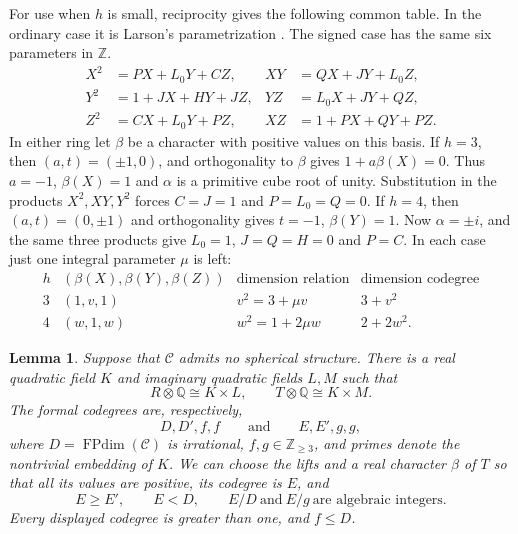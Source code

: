 \documentclass[11pt,a4paper]{article}
\newtheorem{lemma}[theorem]{Lemma}
\theoremstyle{definition}\newtheorem{definition}[theorem]{Definition}
\theoremstyle{remark}\newtheorem{remark}[theorem]{Remark}
\newcommand{\C}{\mathcal C}
\newcommand{\Q}{\mathbb Q}
\newcommand{\ZZ}{\mathbb Z}
\numberwithin{equation}{section}
\begin{document}
For use when $h$ is small, reciprocity gives the following common
table. In the ordinary case it is Larson's parametrization
\cite[Proposition~2.1]{Larson}. The signed case has the same six
parameters in $\ZZ$.
\begin{equation}\label{ns:eq:ns-signed-table}
\begin{aligned}
 X^2&=P X+L_0Y+C Z,& XY&=Q X+JY+L_0 Z,\\
 Y^2&=1+J X+H Y+J Z,& YZ&=L_0 X+J Y+Q Z,\\
 Z^2&=C X+L_0 Y+P Z,& XZ&=1+P X+Q Y+P Z .
\end{aligned}
\end{equation}
In either ring let $\beta$ be a character with positive values on
this basis. If $h=3$, then $(a,t)=(\pm1,0)$, and orthogonality to
$\beta$ gives $1+a\beta(X)=0$. Thus $a=-1$, $\beta(X)=1$ and
$\alpha$ is a primitive cube root of unity. Substitution in the
products $X^2,XY,Y^2$ forces $C=J=1$ and $P=L_0=Q=0$.
If $h=4$, then $(a,t)=(0,\pm1)$ and orthogonality gives $t=-1$,
$\beta(Y)=1$. Now $\alpha=\pm i$, and the same three products
give $L_0=1$, $J=Q=H=0$ and $P=C$. In each case just one integral
parameter $\mu$ is left:
\begin{equation}\label{ns:eq:two-forms}
\begin{array}{c|c|c|c}
h & (\beta(X),\beta(Y),\beta(Z)) &\text{dimension relation}
  &\text{dimension codegree}\\ \hline
3 &(1,v,1)&v^2=3+\mu v&3+v^2\\
4 &(w,1,w)&w^2=1+2\mu w&2+2w^2 .
\end{array}
\end{equation}

\begin{lemma}\label{ns:lem:ns-fields}
Suppose that $\C$ admits no spherical structure. There is a real quadratic
field $K$ and imaginary quadratic fields $L,M$ such that
\[
 R\otimes\Q\cong K\times L,\qquad
 T\otimes\Q\cong K\times M.
\]
The formal codegrees are, respectively,
\[
 D,D',f,f\qquad\text{and}\qquad E,E',g,g,
\]
where $D=\operatorname{FPdim}(\C)$ is irrational,
$f,g\in\ZZ_{\geq3}$, and primes denote the nontrivial embedding
of $K$. We can choose the lifts and a real character $\beta$ of $T$
so that all its values are positive, its codegree is $E$, and
\begin{equation}\label{ns:eq:ns-basic}
 E\geq E',\qquad E<D,\qquad
 E/D\ \text{and}\ E/g\ \text{are algebraic integers}.
\end{equation}
Every displayed codegree is greater than one, and $f\leq D$.
\end{lemma}
\end{document}
